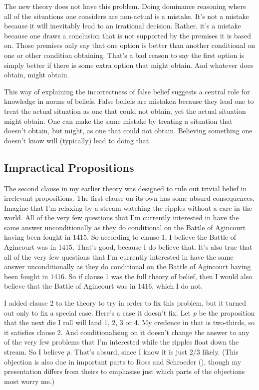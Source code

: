 \documentclass[
  10pt,
  letterpaper,
  twoside]{scrbook}
\begin{document}
The new theory does not have this problem. Doing dominance reasoning
where all of the situations one considers are non-actual is a mistake.
It's not a mistake because it will inevitably lead to an irrational
decision. Rather, it's a mistake because one draws a conclusion that is
not supported by the premises it is based on. Those premises only say
that one option is better than another conditional on one or other
condition obtaining. That's a bad reason to say the first option is
simply better if there is some extra option that might obtain. And
whatever does obtain, might obtain.

This way of explaining the incorrectness of false belief suggests a
central role for knowledge in norms of beliefs. False beliefs are
mistaken because they lead one to treat the actual situation as one that
could not obtain, yet the actual situation might obtain. One can make
the same mistake by treating a situation that doesn't obtain, but might,
as one that could not obtain. Believing something one doesn't know will
(typically) lead to doing that.

\subsection{Impractical Propositions}\label{sec-meimpractical}

The second clause in my earlier theory was designed to rule out trivial
belief in irrelevant propositions. The first clause on its own has some
absurd consequences. Imagine that I'm relaxing by a stream watching the
ripples without a care in the world. All of the very few questions that
I'm currently interested in have the same answer unconditionally as they
do conditional on the Battle of Agincourt having been fought in 1415. So
according to clause 1, I believe the Battle of Agincourt was in 1415.
That's good, because I do believe that. It's also true that all of the
very few questions that I'm currently interested in have the same answer
unconditionally as they do conditional on the Battle of Agincourt having
been fought in 1416. So if clause 1 was the full theory of belief, then
I would also believe that the Battle of Agincourt was in 1416, which I
do not.

I added clause 2 to the theory to try in order to fix this problem, but
it turned out only to fix a special case. Here's a case it doesn't fix.
Let \emph{p} be the proposition that the next die I roll will land 1, 2,
3 or 4. My credence in that is two-thirds, so it satisfies clause 2. And
conditionalising on it doesn't change the answer to any of the very few
problems that I'm interested while the ripples float down the stream. So
I believe \emph{p}. That's absurd, since I know it is just 2/3 likely.
(This objection is also due in important parts to Ross and Schroeder
(), though my presentation differs
from theirs to emphasise just which parts of the objections most worry
me.)
\end{document}
